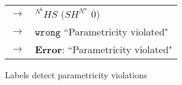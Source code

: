\begin{figure}
\begin{tabular}{ll}
\vspace{5pt}

$\rightarrow$ & ${^{N^{b}}H}S$ $(SH^{N^{a}}$ $\overline{0})$ \\

\vspace{5pt}

$\rightarrow$ & $\mathtt{wrong}$ ``Parametricity violated" \\

\vspace{5pt}

$\rightarrow$ & \textbf{Error}: ``Parametricity violated"
\end{tabular}
\caption{Labels detect parametricity violations}
\label{forall-2}
\end{figure}